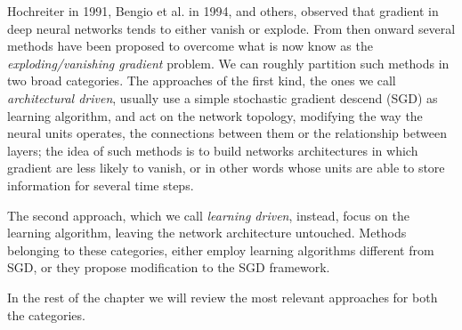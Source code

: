 
Hochreiter\cite{lstm} in 1991, Bengio et al.\cite{learningIsDifficult} in 1994, and others, observed that gradient in 
deep neural networks tends to either vanish or explode. From then onward several methods have been proposed to 
overcome what is now know as the \textit{exploding/vanishing gradient} problem. We can roughly partition such methods in 
two broad categories.
The approaches of the first kind, the ones we call \textit{architectural driven}, usually use a simple stochastic gradient descend (SGD) as learning algorithm, and act on the network topology, modifying the way the 
neural units operates, the connections between them or the relationship between layers; the idea of such methods is to 
build networks architectures in which gradient are less likely to vanish, or in other words whose units are able to 
store information for several time steps.

The second approach, which we call \textit{learning driven}, instead, focus on the learning algorithm, leaving the 
network architecture untouched. Methods belonging to these categories, either employ learning algorithms different from 
SGD, or they propose modification to the SGD framework.


In the rest of the chapter we will review the most relevant approaches for both the categories.
